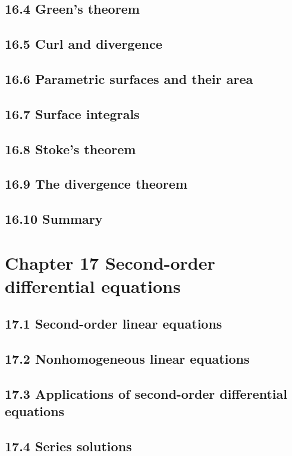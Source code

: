 \documentclass{article}
\begin{document}
\subsection{16.4 Green's theorem}
\subsection{16.5 Curl and divergence}
\subsection{16.6 Parametric surfaces and their area}
\subsection{16.7 Surface integrals}
\subsection{16.8 Stoke's theorem}
\subsection{16.9 The divergence theorem}
\subsection{16.10 Summary}

\section{Chapter 17 Second-order differential equations}
\subsection{17.1 Second-order linear equations}
\subsection{17.2 Nonhomogeneous linear equations}
\subsection{17.3 Applications of second-order differential equations}
\subsection{17.4 Series solutions}
\end{document}
